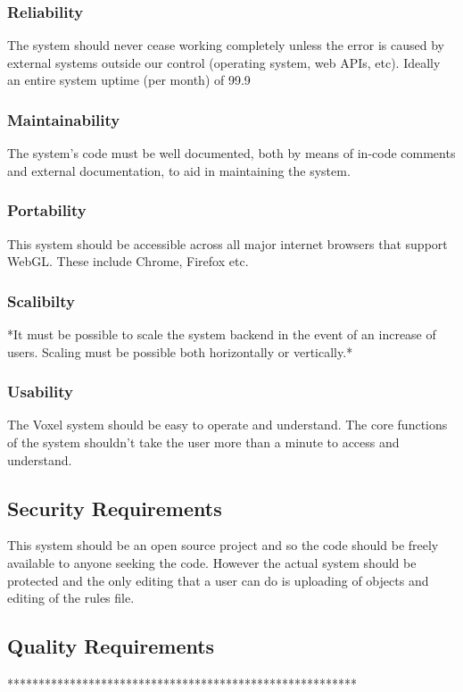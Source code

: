 \documentclass[english]{article}
\begin{document}
		\subsubsection{Reliability}
		The system should never cease working completely unless the error is caused
		by external systems outside our control (operating system, web APIs, etc).
		Ideally an entire system uptime (per month) of 99.9%
		
		\subsubsection{Maintainability}
		The system’s code must be well documented, both by means of in-code comments and external documentation, to aid in 
		maintaining the system.
		
		\subsubsection{Portability}
		This system should be accessible across all major internet browsers that support WebGL. These include Chrome, Firefox 			etc.
		
		\subsubsection{Scalibilty}
		*It must be possible to scale the system backend in the event of an increase of users. Scaling must be possible both 
		horizontally or vertically.*
		
		\subsubsection{Usability}
		The Voxel system should be easy to operate and understand. The core functions of the system shouldn't take the user more 
		than a minute to access and understand.
		
		\subsection{Security Requirements}
		This system should be an open source project and so the code should be freely available to anyone seeking the code.
		However the actual system should be protected and the only editing that a user can do is uploading of objects and 
		editing of the rules file.
		
		\subsection{Quality Requirements}
		********************************************************
		
	\pagebreak
	
\end{document}
